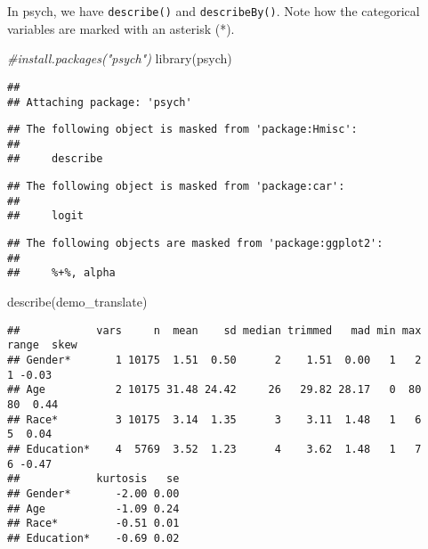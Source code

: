 \documentclass[
]{book}
\newenvironment{Shaded}{\begin{snugshade}}{\end{snugshade}}
\newcommand{\CommentTok}[1]{\textcolor[rgb]{0.56,0.35,0.01}{\textit{#1}}}
\newcommand{\FunctionTok}[1]{\textcolor[rgb]{0.00,0.00,0.00}{#1}}
\newcommand{\NormalTok}[1]{#1}
\newcommand{\SpecialCharTok}[1]{\textcolor[rgb]{0.00,0.00,0.00}{#1}}
\begin{document}
In psych, we have \texttt{describe()} and \texttt{describeBy()}. Note how the categorical variables are marked with an asterisk (*).

\begin{Shaded}
\begin{Highlighting}[]
\CommentTok{\#install.packages("psych")}
\FunctionTok{library}\NormalTok{(psych)}
\end{Highlighting}
\end{Shaded}

\begin{verbatim}
## 
## Attaching package: 'psych'
\end{verbatim}

\begin{verbatim}
## The following object is masked from 'package:Hmisc':
## 
##     describe
\end{verbatim}

\begin{verbatim}
## The following object is masked from 'package:car':
## 
##     logit
\end{verbatim}

\begin{verbatim}
## The following objects are masked from 'package:ggplot2':
## 
##     %+%, alpha
\end{verbatim}

\begin{Shaded}
\begin{Highlighting}[]
\FunctionTok{describe}\NormalTok{(demo\_translate)}
\end{Highlighting}
\end{Shaded}

\begin{verbatim}
##            vars     n  mean    sd median trimmed   mad min max range  skew
## Gender*       1 10175  1.51  0.50      2    1.51  0.00   1   2     1 -0.03
## Age           2 10175 31.48 24.42     26   29.82 28.17   0  80    80  0.44
## Race*         3 10175  3.14  1.35      3    3.11  1.48   1   6     5  0.04
## Education*    4  5769  3.52  1.23      4    3.62  1.48   1   7     6 -0.47
##            kurtosis   se
## Gender*       -2.00 0.00
## Age           -1.09 0.24
## Race*         -0.51 0.01
## Education*    -0.69 0.02
\end{verbatim}

\begin{Shaded}
\end{Shaded}
\end{document}
